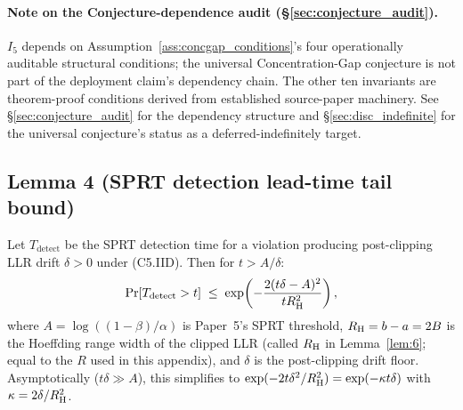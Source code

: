 \paragraph{Note on the Conjecture-dependence audit (\S\ref{sec:conjecture_audit}).}
$I_5$ depends on Assumption~\ref{ass:concgap_conditions}'s four
operationally auditable structural conditions; the universal
Concentration-Gap conjecture is not part of the deployment
claim's dependency chain. The other ten invariants are
theorem-proof conditions derived from established source-paper
machinery. See \S\ref{sec:conjecture_audit} for the dependency
structure and \S\ref{sec:disc_indefinite} for the universal
conjecture's status as a deferred-indefinitely target.

\subsection{Lemma 4 (SPRT detection lead-time tail bound)}
\label{sec:lem4}

\begin{lemma}
\label{lem:4}
Let $T_{\mathrm{detect}}$ be the SPRT detection time for a
violation producing post-clipping LLR drift $\delta > 0$ under
(C5.IID).  Then for $t > A/\delta$:
\[
  \Pr[T_{\mathrm{detect}} > t]
  \;\leq\; \exp\!\left(-\frac{2(t\delta - A)^2}{t R_{\mathrm{H}}^2}\right),
\]
where $A = \log((1-\beta)/\alpha)$ is Paper~5's SPRT threshold,
$R_{\mathrm{H}} = b - a = 2B$ is the Hoeffding range width of the
clipped LLR (called $R_{\mathrm{H}}$ in Lemma~\ref{lem:6}; equal to the
$R$ used in this appendix), and $\delta$ is the post-clipping drift
floor.  Asymptotically ($t\delta \gg A$), this simplifies to
$\exp(-2t\delta^2/R_{\mathrm{H}}^2) = \exp(-\kappa t \delta)$ with
$\kappa = 2\delta/R_{\mathrm{H}}^2$.
\end{lemma}

